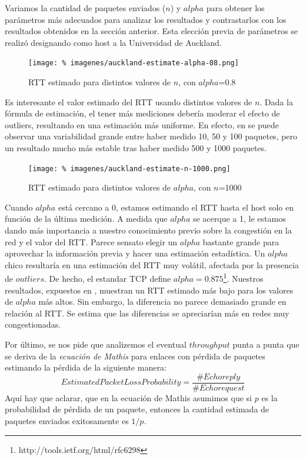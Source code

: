 \documentclass[final,inline,a4paper,narroweqnarray]{ieee}
\begin{document}
Variamos la cantidad de paquetes enviados ($n$) y $alpha$ para obtener los parámetros más
adecuados para analizar los resultados y contrastarlos con los resultados obtenidos en la sección anterior.
Esta elección previa de parámetros se realizó designando como host a la Universidad de Auckland.

\begin{figure}[ht]\begin{center}
   \texttt{[image: \%
    imagenes/auckland-estimate-alpha-08.png]}
    \caption{RTT estimado para distintos valores de $n$, con $alpha$=0.8}
    \label{fig:auckland-estimate-alpha-08}
\end{center}\end{figure}

Es interesante el valor estimado del RTT usando distintos valores de $n$. Dada la fórmula de estimación, el tener más mediciones debería moderar el efecto de outliers, resultando en una estimación más uniforme.
En efecto, en  se puede observar una variabilidad grande entre haber medido 10, 50 y 100 paquetes, pero un resultado mucho más estable tras haber medido 500 y 1000 paquetes.

\begin{figure}[ht]\begin{center}
   \texttt{[image: \%
    imagenes/auckland-estimate-n-1000.png]}
    \caption{RTT estimado para distintos valores de $alpha$, con $n$=1000}
    \label{fig:auckland-estimate-n-1000}
\end{center}\end{figure}

Cuando $alpha$ está cercano a 0, estamos estimando el RTT hasta el host solo en función de la última medición. A medida que $alpha$ se acerque a 1, le estamos dando más importancia a nuestro conocimiento previo sobre la congestión en la red y el valor del RTT. Parece sensato elegir un $alpha$ bastante grande para aprovechar la información previa y hacer una estimación estadística. Un $alpha$ chico resultaría en una estimación del RTT muy volátil, afectada por la presencia de $outliers$.
De hecho, el estandar TCP define $alpha=0.875$\footnote{http://tools.ietf.org/html/rfc6298}.
Nuestros resultados, expuestos en , muestran un RTT estimado más bajo para los valores de $alpha$ más altos. Sin embargo, la diferencia no parece demasiado grande en relación al RTT. Se estima que las diferencias se apreciarían más en redes muy congestionadas.

Por último, se nos pide que analizemos el eventual $throughput$ punta a punta
que se deriva de la \emph{ecuación de Mathis} para enlaces con pérdida de
paquetes estimando la pérdida de la siguiente manera:
\[
EstimatedPacketLossProbability = \dfrac{\#Echo reply}{\#Echo request}
\]
Aquí hay que aclarar, que en la ecuación de Mathis asumimos que si $p$ es la
probabilidad de pérdida de un paquete, entonces la cantidad estimada de paquetes
enviados exitosamente es $1/p$.
\end{document}
